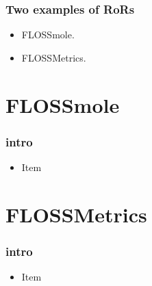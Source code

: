 \documentclass{beamer}
\begin{document}
\begin{frame}
\frametitle{Two examples of RoRs}
\begin{itemize}
\item FLOSSmole.
\item FLOSSMetrics.
\end{itemize}
\end{frame}

\section{FLOSSmole}

\begin{frame}
\frametitle{intro}
\begin{itemize}
\item Item
\end{itemize}
\end{frame}

\section{FLOSSMetrics}

\begin{frame}
\frametitle{intro}
\begin{itemize}
\item Item
\end{itemize}
\end{frame}

\end{document}
